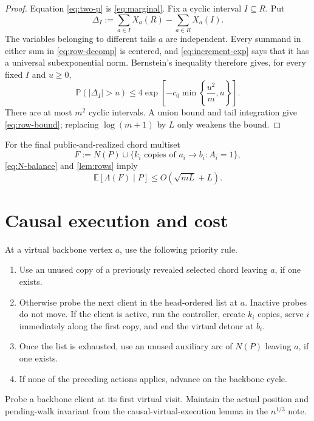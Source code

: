 \documentclass[11pt]{article}
\theoremstyle{remark}
\newcommand{\E}{\mathbb E}
\newcommand{\Pp}{\mathbb P}
\begin{document}
\begin{proof}
Equation \eqref{eq:two-p} is \eqref{eq:marginal}.  Fix a cyclic interval
$I\subseteq R$.  Put
\begin{equation}\label{eq:row-decomp}
 \Delta_I:=\sum_{a\in I}X_a(R)-\sum_{a\in R}X_a(I).
\end{equation}
The variables belonging to different tails $a$ are independent.  Every
summand in either sum in \eqref{eq:row-decomp} is centered, and
\eqref{eq:increment-exp} says that it has a universal subexponential norm.
Bernstein's inequality therefore gives, for every fixed $I$ and $u\ge0$,
\[
 \Pp\left(|\Delta_I|>u\right)
 \le4\exp\left[-c_0\min\left\{\frac{u^2}{m},u\right\}\right].
\]
There are at most $m^2$ cyclic intervals.  A union bound and tail integration
give \eqref{eq:row-bound}; replacing $\log(m+1)$ by $L$ only weakens the
bound.
\end{proof}

For the final public-and-realized chord multiset
\[
 F:=N(P)\cup\{k_i\text{ copies of }a_i\to b_i:A_i=1\},
\]
\eqref{eq:N-balance} and \cref{lem:rows} imply
\begin{equation}\label{eq:Lambda}
 \E[\Lambda(F)\mid P]
 \le O(\sqrt{mL}+L).
\end{equation}

\section{Causal execution and cost}

At a virtual backbone vertex $a$, use the following priority rule.
\begin{enumerate}[leftmargin=2em]
 \item Use an unused copy of a previously revealed selected chord leaving
 $a$, if one exists.
 \item Otherwise probe the next client in the head-ordered list at $a$.
 Inactive probes do not move.  If the client is active, run the controller,
 create $k_i$ copies, serve $i$ immediately along the first copy, and end the
 virtual detour at $b_i$.
 \item Once the list is exhausted, use an unused auxiliary arc of $N(P)$
 leaving $a$, if one exists.
 \item If none of the preceding actions applies, advance on the backbone
 cycle.
\end{enumerate}
Probe a backbone client at its first virtual visit.  Maintain the actual
position and pending-walk invariant from the causal-virtual-execution lemma in
the $n^{1/3}$ note.
\end{document}
